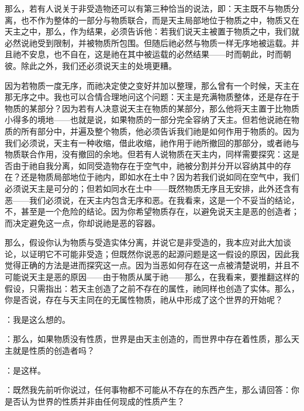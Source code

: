 那么，若有人说关于非受造物还可以有第三种恰当的说法，即：天主既不与物质分离，也不作为整体的一部分与物质联合，而是天主局部地位于物质之中，物质又在天主之中，那么，作为结果，必须告诉他：若我们说天主被置于物质之中，我们就必然说祂受到限制，并被物质所包围。但随后祂必然与物质一样无序地被运载。并且祂不安息，也不自在，这是祂在其中被运载的必然结果——时而朝此，时而朝彼。除此之外，我们还必须说天主的处境更糟。\par

因为若物质一度无序，而祂决定使之变好并加以整理，那么曾有一个时候，天主在那无序之中。我也可以合情合理地问这个问题：天主是充满物质整体，还是存在于物质的某部分？因为若有人决意说天主在物质的某部分，那么他将天主置于比物质小得多的境地——也就是说，如果物质的一部分完全容纳了天主。但若他说祂在物质的所有部分中，并遍及整个物质，他必须告诉我们祂是如何作用于物质的。因为我们必须说，天主有一种收缩，借此收缩，祂作用于祂所撤回的那部分，或者祂与物质联合作用，没有撤回的余地。但若有人说物质在天主内，同样需要探究：这是否由于祂自我分离，如同受造物存在于空气中，祂被分割并分开以容纳其中的存在？还是物质局部地位于祂内，即如水在土中？因为若我们说如同在空气中，我们必须说天主是可分的；但若如同水在土中——既然物质无序且无安排，此外还含有恶——我们必须说，在天主内包含无序和恶。在我看来，这是一个不妥当的结论，不，甚至是一个危险的结论。因为你希望物质存在，以避免说天主是恶的创造者；而决定避免这一点，你却说祂是恶的容器。\par

那么，假设你认为物质与受造实体分离，并说它是非受造的，我本应对此大加谈论，以证明它不可能非受造；但既然你说恶的起源问题是这一假设的原因，因此我觉得正确的方法是进而探究这一点。因为当恶如何存在这一点被清楚说明，并且不可能说天主是恶的原因——由于物质从属于祂——那么，在我看来，要推翻这样的假设，只需指出：若天主创造了之前不存在的属性，祂同样也创造了实体。那么，你是否说，存在与天主同在的无属性物质，祂从中形成了这个世界的开始呢？\par

：我是这么想的。\par

：那么，如果物质没有性质，世界是由天主创造的，而世界中存在着性质，那么天主就是性质的创造者吗？\par

：是这样。\par

：既然我先前听你说过，任何事物都不可能从不存在的东西产生，那么请回答：你是否认为世界的性质并非由任何现成的性质产生？\par

